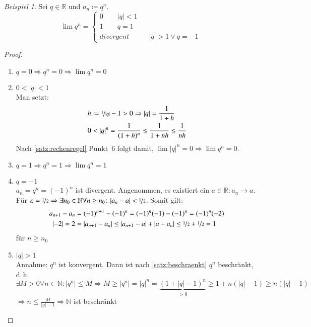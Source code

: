 \documentclass[ngerman,titlepage,twoside, parskip=half*]{scrreprt}
\newcommand*{\N}{\mathbb{N}}
\newcommand*{\R}{\mathbb{R}}
\theoremstyle{plain}
\theoremstyle{definition}
\theoremstyle{remark}
\newtheorem*{beispiel}{Beispiel}
\newcommand*{\abs}[2][]{#1\lvert#2#1\rvert}
\begin{document}
\begin{beispiel}
  Sei $q \in \R$ und $a_n \coloneqq q^n$.
  \[\lim q^n =
  \begin{cases}
    0 \qquad \abs{q} < 1\\
    1 \qquad q = 1\\
    divergent \qquad & \abs{q}>1 \vee q=-1
  \end{cases}\]
\begin{proof}
  \begin{enumerate}[1.~F{a}ll]
  \item $q=0 \Rightarrow q^n=0 \Rightarrow \lim q^n=0$
  \item $0<\abs{q}<1$\\
    Man setzt:
    \begin{align*}
      h &\coloneqq \nicefrac{1}{\abs{q}}-1>0\Rightarrow \abs{q} =
      \frac{1}{1+h}\\
      0 &<\abs{q}^n = \frac{1}{(1+h)^n} \leq \frac{1}{1+nh} \leq
      \frac{1}{nh}
    \end{align*}
    Nach \autoref{satz:rechenregel} Punkt~6 folgt damit, $\lim \abs{q}^n=0
    \Rightarrow \lim q^n=0$.
  \item $q=1 \Rightarrow q^n =1 \Rightarrow \lim q^n=1$
  \item $q=-1$\\
    $a_n=q^n=(-1)^n$ ist divergent. Angenommen, es existiert ein $a
    \in \R \colon a_n \rightarrow a$. Für $\varepsilon=\nicefrac{1}{2}
    \Rightarrow \exists n_0 \in \N \forall n \geq n_0 \colon
    \abs{a_n-a}<\nicefrac{1}{2}$. Somit gilt:
    \begin{align*}
      a_{n+1}-a_n& = (-1)^{n+1}-(-1)^n = (-1)^n(-1)-(-1)^n =
      (-1)^n(-2)\\ \
      \abs{-2}=2 &= \abs{a_{n+1}-a_n} \leq \abs{a_{n+1}-a} + \abs{a-a_n} \leq
      \nicefrac{1}{2} +\nicefrac{1}{2}=1
    \end{align*}
    für $n \geq n_0$ \lightning
  \item $\abs{q}>1$\\
    Annahme: $q^n$ ist konvergent. Dann ist nach
    \autoref{satz:beschraenkt} $q^n$ beschränkt, d.\,h. $\exists M >
    0 \forall n \in \N \colon \abs{q^n} \leq M \Rightarrow M \geq
    \abs{q^n} = \abs{q}^n
    =\underbrace{(1+\abs{q}-1)^n}_{>0} \geq 1+n(\abs{q}-1) \geq n(\abs{q}-1)$\\
    $\Rightarrow n \leq \frac{M}{\abs{q}-1} \Rightarrow \N$ ist beschränkt
    \lightning
\end{enumerate}
\end{proof}
\end{beispiel}
\end{document}
